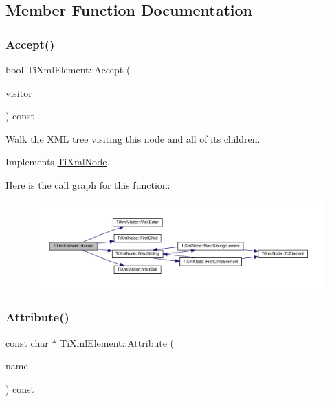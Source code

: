 \subsection{Member Function Documentation}
\mbox{\label{classTiXmlElement_a01d33358cce9d1817b557d314dda3779}} 
\subsubsection{\texorpdfstring{Accept()}{Accept()}}
{\footnotesize\ttfamily bool Ti\+Xml\+Element\+::\+Accept (\begin{DoxyParamCaption}\item[{\hyperlink{classTiXmlVisitor}{Ti\+Xml\+Visitor} $\ast$}]{visitor }\end{DoxyParamCaption}) const\hspace{0.3cm}{\ttfamily [virtual]}}

Walk the X\+ML tree visiting this node and all of its children. 

Implements \hyperlink{classTiXmlNode_acc0f88b7462c6cb73809d410a4f5bb86}{Ti\+Xml\+Node}.

Here is the call graph for this function\+:
\nopagebreak
\begin{figure}[H]
\begin{center}
\leavevmode
\includegraphics[width=350pt]{classTiXmlElement_a01d33358cce9d1817b557d314dda3779_cgraph}
\end{center}
\end{figure}
\mbox{\label{classTiXmlElement_a6042f518748f475a7ac4b4e0b509eb05}} 
\subsubsection{\texorpdfstring{Attribute()}{Attribute()}\hspace{0.1cm}{\footnotesize\ttfamily [1/3]}}
{\footnotesize\ttfamily const char $\ast$ Ti\+Xml\+Element\+::\+Attribute (\begin{DoxyParamCaption}\item[{const char $\ast$}]{name }\end{DoxyParamCaption}) const}

